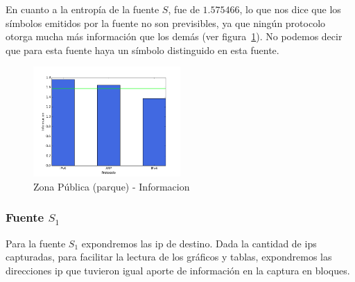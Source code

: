 \documentclass[final,inline,narroweqnarray,a4paper]{ieee}
\begin{document}
En cuanto a la entropía de la fuente $S$, fue de $1.575466$, lo que nos dice que los símbolos emitidos por la fuente no son previsibles, ya que ningún protocolo otorga mucha más información que los demás (ver figura~\ref{histo:parqueS}). No podemos decir que para esta fuente haya un símbolo distinguido en esta fuente.

\begin{figure}[H]
    \begin{center}
        \includegraphics[width=0.5\textwidth]{plot/parqueS-bar.png}
        \caption{Zona Pública (parque) - Informacion}
        \label{histo:parqueS}
    \end{center}
\end{figure}

\subsubsection{Fuente $S_1$}

Para la fuente $S_1$ expondremos las ip de destino. Dada la cantidad de ips capturadas, para facilitar la lectura de los gráficos y tablas, expondremos las direcciones ip que tuvieron igual aporte de información en la captura en bloques.
\end{document}
